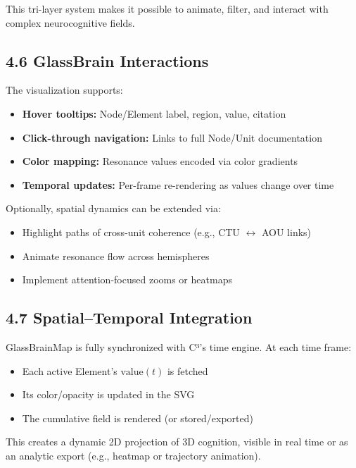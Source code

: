 \documentclass[10pt]{article}
\begin{document}
This tri-layer system makes it possible to animate, filter, and interact with complex neurocognitive fields.

\subsection*{4.6 GlassBrain Interactions}

The visualization supports:

\begin{itemize}
    \item \textbf{Hover tooltips:} Node/Element label, region, value, citation
    \item \textbf{Click-through navigation:} Links to full Node/Unit documentation
    \item \textbf{Color mapping:} Resonance values encoded via color gradients
    \item \textbf{Temporal updates:} Per-frame re-rendering as values change over time
\end{itemize}

Optionally, spatial dynamics can be extended via:

\begin{itemize}
    \item Highlight paths of cross-unit coherence (e.g., CTU $\leftrightarrow$ AOU links)
    \item Animate resonance flow across hemispheres
    \item Implement attention-focused zooms or heatmaps
\end{itemize}

\subsection*{4.7 Spatial–Temporal Integration}

GlassBrainMap is fully synchronized with C³'s time engine. At each time frame:

\begin{itemize}
    \item Each active Element’s $\text{value}(t)$ is fetched
    \item Its color/opacity is updated in the SVG
    \item The cumulative field is rendered (or stored/exported)
\end{itemize}

This creates a dynamic 2D projection of 3D cognition, visible in real time or as an analytic export (e.g., heatmap or trajectory animation).
\end{document}
